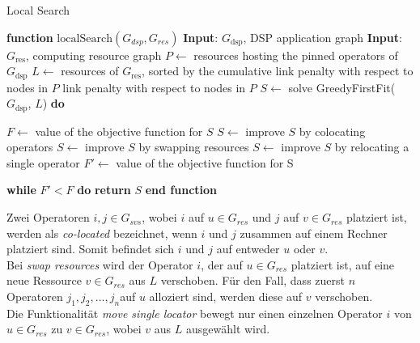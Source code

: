\documentclass{article}
\begin{document}
\begin{algorithm}[H]
    \caption{Local Search}
    \begin{algorithmic}[1]
        \STATE \textbf{function} $\mathrm{localSearch}(G_{dsp}, G_{res})$
        \STATE \textbf{Input}: $G_{\text{dsp}}$, DSP application graph
        \STATE \textbf{Input}: $G_{\text{res}}$, computing resource graph
        \STATE $P \leftarrow$ resources hosting the pinned operators of $G_{\text{dsp}}$
        \STATE $L \leftarrow$ resources of $G_{\text{res}}$, 
        sorted by the cumulative link penalty with respect to nodes in $P$
        \STATE link penalty with respect to nodes in $P$
        \STATE $S \leftarrow$  solve GreedyFirstFit($G_{\text{dsp}}$, $L$)
        \STATE \textbf{do}

        \STATE \hspace{\algorithmicindent} $F \leftarrow$  value of the objective function for $S$
        \STATE \hspace{\algorithmicindent} $S \leftarrow$  improve $S$ by colocating operators
        \STATE \hspace{\algorithmicindent} $S \leftarrow$  improve $S$ by swapping resources
        \STATE \hspace{\algorithmicindent} $S \leftarrow$  improve $S$ by relocating a single operator
        \STATE \hspace{\algorithmicindent} $F' \leftarrow$ value of the objective function for S

        \STATE \textbf{while} $F'  < F$ \textbf{do}
        \STATE \hspace{\algorithmicindent} \textbf{return} $S$
        \STATE \textbf{end function}
    \end{algorithmic}
\end{algorithm}


Zwei Operatoren $i,j \in G_{svs}$, wobei $i$ auf $u \in G_{res}$ und $j$ auf $v \in G_{res}$ platziert ist, werden als \textit{co-located} bezeichnet, 
wenn $i$ und $j$ zusammen auf einem Rechner platziert sind. Somit befindet sich $i$ und $j$ auf entweder $u$ oder $v$.\\
Bei \textit{swap resources} wird der Operator $i$, der auf $u \in G_{res}$ platziert ist, auf eine neue Ressource $v \in G_{res}$ aus $L$ verschoben. 
Für den Fall, dass zuerst $n$ Operatoren $j_1, j_2, ..., j_n$auf $u$ alloziert sind, werden diese auf $v$ verschoben. \\ 
Die Funktionalität \textit{move single locator}  bewegt nur einen einzelnen Operator $i$ von $u \in G_{res}$ zu $v \in G_{res}$, wobei $v$ aus $L$ ausgewählt wird. 
\end{document}

